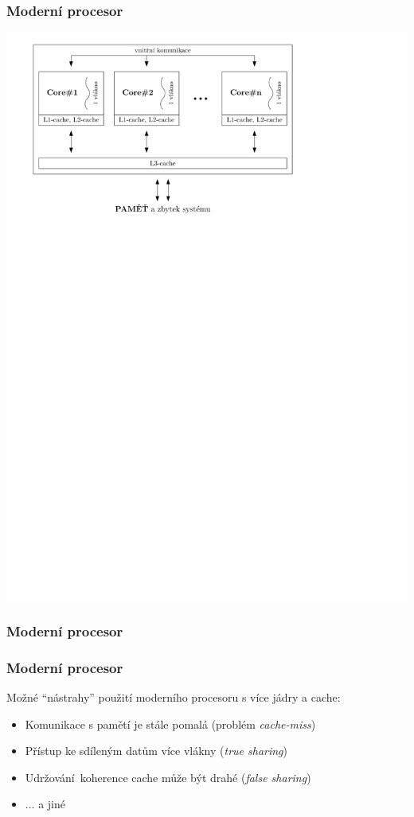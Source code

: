 \documentclass[usenames,dvipsnames,9pt]{beamer}
\begin{document}
\begin{frame}
  \frametitle{Moderní procesor}
  \centering\includegraphics[width=0.8\linewidth]{figs/modern_cpu.pdf}
\end{frame}
\begin{frame}[t]
  \frametitle{Moderní procesor}
  \centering
\end{frame}
\begin{frame}
  \frametitle{Moderní procesor}
  Možné ``nástrahy'' použití moderního procesoru s více jádry a cache:
  \begin{itemize}
    \item Komunikace s pamětí je stále pomalá (problém \emph{cache-miss})
    \item Přístup ke sdíleným datům více vlákny (\emph{true sharing})
    \item Udržování koherence cache může být drahé (\emph{false sharing}) \\[2em]
    \item ... a jiné
  \end{itemize}
\end{frame}
\end{document}

